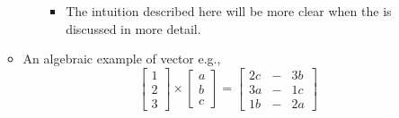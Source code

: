 \begin{itemize}
\begin{itemize}
\begin{itemize}
\begin{itemize}
        \item The intuition described here will be more clear when the \hyperref[The Determinant]{} is discussed in more detail.
      \end{itemize}
    \end{itemize}
    \item An algebraic example of vector e.g.,
    \[%
    \begin{bmatrix}
    1 \\
    2 \\
    3 
    \end{bmatrix}
    \times
    \begin{bmatrix}
    a \\
    b \\
    c 
    \end{bmatrix}
    =
    \begin{bmatrix}
    2c & - & 3b \\
    3a & - & 1c \\
    1b & - & 2a 
    \end{bmatrix}
    \]%
  \end{itemize}
  

\end{itemize}
